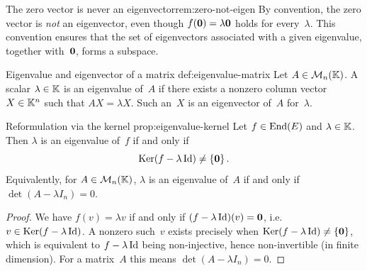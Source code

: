 \begin{remark}{The zero vector is never an eigenvector}{rem:zero-not-eigen}
By convention, the zero vector is \emph{not} an eigenvector, even
though $f(\mathbf{0}) = \lambda\mathbf{0}$ holds for every~$\lambda$.  This
convention ensures that the set of eigenvectors associated with a
given eigenvalue, together with~$\mathbf{0}$, forms a subspace.
\end{remark}

\begin{definition}{Eigenvalue and eigenvector of a matrix}%
{def:eigenvalue-matrix}
Let $A\in\mathcal{M}_n({\mathbb{K}})$.  A scalar $\lambda\in{\mathbb{K}}$ is an eigenvalue
of~$A$ if there exists a nonzero column vector
$X\in{\mathbb{K}}^n$ such that $AX = \lambda X$.  Such an~$X$ is an
eigenvector of~$A$ for~$\lambda$.
\end{definition}

\begin{proposition}{Reformulation via the kernel}%
{prop:eigenvalue-kernel}
Let $f\in\operatorname{End}(E)$ and $\lambda\in{\mathbb{K}}$.  Then $\lambda$ is an
eigenvalue of~$f$ if and only if
\[
  \operatorname{Ker}(f - \lambda\operatorname{Id}) \neq \left\{\mathbf{0}\right\}.
\]
Equivalently, for $A\in\mathcal{M}_n({\mathbb{K}})$, $\lambda$ is an eigenvalue of~$A$
if and only if $\det(A - \lambda I_n) = 0$.
\end{proposition}

\begin{proof}
We have $f(v) = \lambda v$ if and only if $(f - \lambda\operatorname{Id})(v) = \mathbf{0}$,
i.e.\ $v\in\operatorname{Ker}(f - \lambda\operatorname{Id})$.  A nonzero such~$v$ exists precisely
when $\operatorname{Ker}(f - \lambda\operatorname{Id}) \neq \left\{\mathbf{0}\right\}$, which is equivalent to
$f - \lambda\operatorname{Id}$ being non-injective, hence non-invertible (in finite
dimension).  For a matrix~$A$ this means $\det(A - \lambda I_n) = 0$.
\end{proof}

